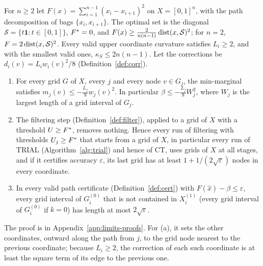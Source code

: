 \begin{proposition}\label{lim:prop:setgrowth}
For $n\ge2$ let $F(x)=\sum_{i=1}^{n-1}(x_i-x_{i+1})^2$ on $X=[0,1]^n$, with
the path decomposition of bags $\{x_i,x_{i+1}\}$. The optimal set is the
diagonal $\mathcal S=\{t\mathbf1:t\in[0,1]\}$, $F^{*}=0$, and
$F(x)\ge\frac2{n(n-1)}\operatorname{dist}(x,\mathcal S)^2$; for $n=2$,
$F=2\operatorname{dist}(x,\mathcal S)^2$. Every valid upper coordinate curvature satisfies
$L_i\ge2$, and with the smallest valid ones, $\kappa_S\le2n(n-1)$. Let the
corrections be $d_i(v)=L_iw_i(v)^2/8$ (Definition~\ref{def:corr}).
\begin{enumerate}[label=(\alph*)]
\item For every grid $G$ of $X$, every $j$ and every node $v\in G_j$, the
  min-marginal satisfies $m_j(v)\le-\frac{L_j}8w_j(v)^2$. In particular
  $\beta\le-\frac{L_j}8W_j^2$, where $W_j$ is the largest length of a grid
  interval of $G_j$.
\item The filtering step (Definition~\ref{def:filter}), applied to a grid
  of $X$ with a threshold $U\ge F^{*}$, removes nothing. Hence every run of
  filtering with thresholds $U_j\ge F^{*}$ that starts from a grid of $X$, in
  particular every run of TRIAL (Algorithm~\ref{alg:trial}) and hence of CT,
  uses grids of $X$ at all stages, and if it certifies accuracy
  $\varepsilon$, its last grid has at least $1+1/(2\sqrt\varepsilon)$ nodes
  in every coordinate.
\item In every valid path certificate (Definition~\ref{def:cert}) with
  $F(\hat x)-\beta\le\varepsilon$, every grid interval of $G^{(0)}_i$ that is
  not contained in $X^{(1)}_i$ (every grid interval of $G^{(0)}_i$ if $k=0$)
  has length at most $2\sqrt\varepsilon$.
\end{enumerate}
\end{proposition}

The proof is in Appendix~\ref{app:limits-proofs}. For (a), it sets the
other coordinates, outward along the path from $j$, to the grid node nearest
to the previous coordinate; because $L_i\ge2$, the correction of each such
coordinate is at least the square term of its edge to the previous one.

